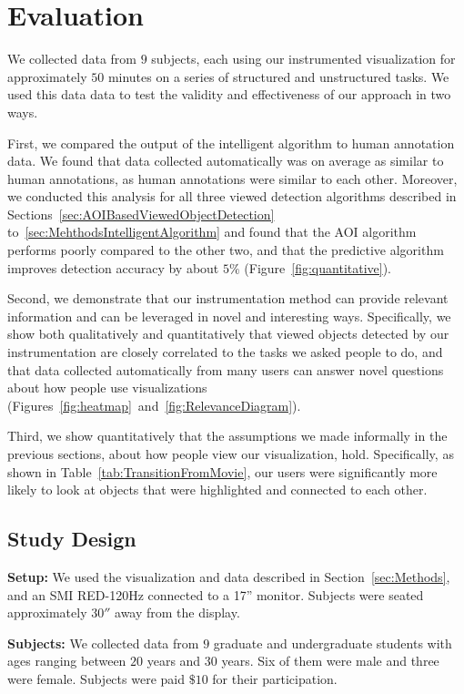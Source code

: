 \section{Evaluation}
\label{sec:Evaluation}
We collected data from $9$ subjects, each using our instrumented visualization for approximately $50$ minutes on a series of structured and unstructured tasks. We used this data data to test the validity and effectiveness of our approach in two ways. 

First, we compared the output of the intelligent algorithm to human annotation data. We found that data collected automatically was on average as similar to human annotations, as human annotations were similar to each other. Moreover, we conducted this analysis for all three viewed detection algorithms described in Sections~\ref{sec:AOIBasedViewedObjectDetection} to~\ref{sec:MehthodsIntelligentAlgorithm} and found that the AOI algorithm performs poorly compared to the other two, and that the predictive algorithm improves detection accuracy by about $5\%$  (Figure~\ref{fig:quantitative}). 

Second, we demonstrate that our instrumentation method can provide relevant information and can be leveraged in novel and interesting ways. Specifically, we show both qualitatively and quantitatively that viewed objects detected by our instrumentation are closely correlated to the tasks we asked people to do, and that data collected automatically from many users can answer novel questions about how people use visualizations (Figures~\ref{fig:heatmap}~and~\ref{fig:RelevanceDiagram}).    

Third, we show quantitatively that the assumptions we made informally in the previous sections, about how people view our visualization, hold. Specifically, as shown in Table~\ref{tab:TransitionFromMovie}, our users were significantly more likely to look at objects that were highlighted and connected to each other. 

\subsection{Study Design }
\label{sec:EvalStudyDesign}

\noindent\textbf{Setup: } We used the visualization and data described in Section~\ref{sec:Methods}, and an SMI RED-120Hz connected to a 17'' monitor. Subjects were seated approximately $30''$ away from the display. 

\noindent\textbf{Subjects:} We collected data from $9$ graduate and undergraduate students with ages ranging between $20$ years and $30$ years. Six of them were male and three were female. Subjects were paid $\$10$ for their participation. 

